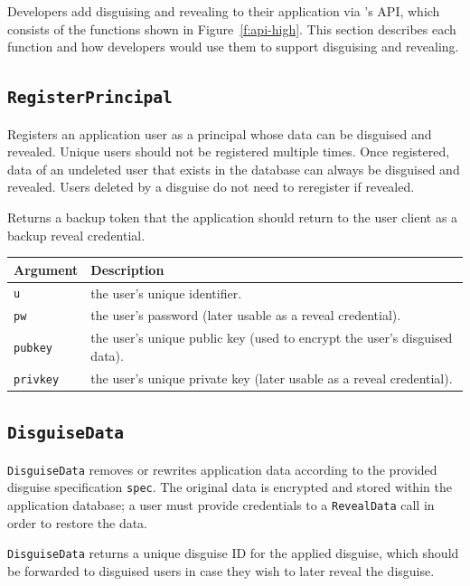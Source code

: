 Developers add disguising and revealing to their application via \sys's API,
which consists of the functions shown in Figure~\ref{f:api-high}. This section
describes each function and how developers would use them to support disguising
and revealing.

\subsection{\texttt{RegisterPrincipal}}
    Registers an application user as a principal whose data can be disguised and
    revealed. Unique users should not be registered multiple times. Once
    registered, data of an undeleted user that exists in the database can always
    be disguised and revealed.  Users deleted by a disguise do not need to
    reregister if revealed.

    Returns a backup token that the application should return to
    the user client as a backup reveal credential.

    \begin{center}
    \begin{longtable}{|m{}|m{}|}
        \hline
        \textbf{Argument} & \textbf{Description} \\
        \hline
        \texttt{u} & the user's unique identifier.\\
        \hline
        \texttt{pw} & the user's password (later usable as a reveal credential).\\
        \hline
        \texttt{pubkey} & the user's unique public key (used to encrypt the
        user's disguised data).\\
        \hline
        \texttt{privkey} & the user's unique private key (later usable as a reveal
        credential).\\
        \hline
    \end{longtable}
    \end{center}

\subsection{\texttt{DisguiseData}}
    \texttt{DisguiseData} removes or rewrites application data according to
    the provided disguise specification \texttt{spec}. The original data
    is encrypted and stored within the application database; a user must provide
    credentials to a \texttt{RevealData} call in order to restore the data.

    \texttt{DisguiseData} returns a unique disguise ID for the applied disguise, which should be
    forwarded to disguised users in case they wish to later reveal the
    disguise.


